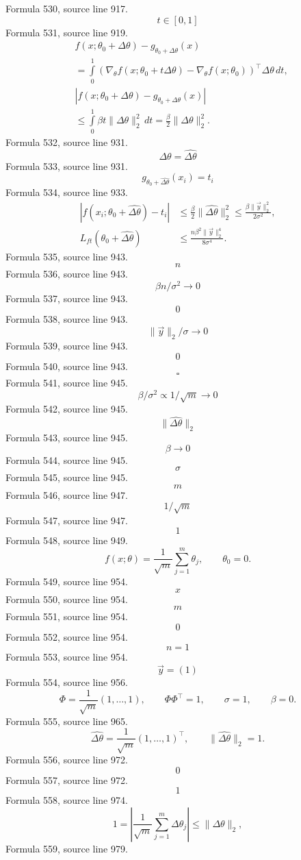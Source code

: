 \documentclass{ctexart}
\begin{document}
Formula 530, source line 917.
\[t\in[0,1]\]
Formula 531, source line 919.
\[
\begin{aligned}
&f(x;\theta_0+\Delta\theta)-g_{\theta_0+\Delta\theta}(x)\\
&=\int\limits_0^1
\left(\nabla_\theta f(x;\theta_0+t\Delta\theta)
-\nabla_\theta f(x;\theta_0)\right)^\top\Delta\theta\,dt,\\
&\left|f(x;\theta_0+\Delta\theta)-g_{\theta_0+\Delta\theta}(x)\right|\\
&\leq\int\limits_0^1\beta t\|\Delta\theta\|_2^2\,dt
=\frac\beta2\|\Delta\theta\|_2^2.
\end{aligned}
\]
Formula 532, source line 931.
\[\Delta\theta=\widehat{\Delta\theta}\]
Formula 533, source line 931.
\[g_{\theta_0+\widehat{\Delta\theta}}(x_i)=t_i\]
Formula 534, source line 933.
\[
\begin{aligned}
\left|f(x_i;\theta_0+\widehat{\Delta\theta})-t_i\right|
&\leq\frac\beta2\|\widehat{\Delta\theta}\|_2^2
\leq\frac{\beta\|\vec y\|_2^2}{2\sigma^2},\\
L_{ft}(\theta_0+\widehat{\Delta\theta})
&\leq\frac{n\beta^2\|\vec y\|_2^4}{8\sigma^4}.
\end{aligned}
\]
Formula 535, source line 943.
\[n\]
Formula 536, source line 943.
\[\beta n/\sigma^2\to0\]
Formula 537, source line 943.
\[0\]
Formula 538, source line 943.
\[\|\vec y\|_2/\sigma\to0\]
Formula 539, source line 943.
\[0\]
Formula 540, source line 943.
\[\square\]
Formula 541, source line 945.
\[\beta/\sigma^2\propto1/\sqrt m\to0\]
Formula 542, source line 945.
\[\|\widehat{\Delta\theta}\|_2\]
Formula 543, source line 945.
\[\beta\to0\]
Formula 544, source line 945.
\[\sigma\]
Formula 545, source line 945.
\[m\]
Formula 546, source line 947.
\[1/\sqrt m\]
Formula 547, source line 947.
\[1\]
Formula 548, source line 949.
\[
f(x;\theta)=\frac1{\sqrt m}\sum\limits_{j=1}^{m}\theta_j,
\qquad\theta_0=0.
\]
Formula 549, source line 954.
\[x\]
Formula 550, source line 954.
\[m\]
Formula 551, source line 954.
\[0\]
Formula 552, source line 954.
\[n=1\]
Formula 553, source line 954.
\[\vec y=(1)\]
Formula 554, source line 956.
\[
\Phi=\frac1{\sqrt m}(1,\ldots,1),
\qquad\Phi\Phi^\top=1,
\qquad\sigma=1,
\qquad\beta=0.
\]
Formula 555, source line 965.
\[
\widehat{\Delta\theta}
=\frac1{\sqrt m}(1,\ldots,1)^\top,
\qquad
\|\widehat{\Delta\theta}\|_2=1.
\]
Formula 556, source line 972.
\[0\]
Formula 557, source line 972.
\[1\]
Formula 558, source line 974.
\[
1=\left|\frac1{\sqrt m}\sum\limits_{j=1}^{m}\Delta\theta_j\right|
\leq\|\Delta\theta\|_2,
\]
Formula 559, source line 979.
\end{document}
